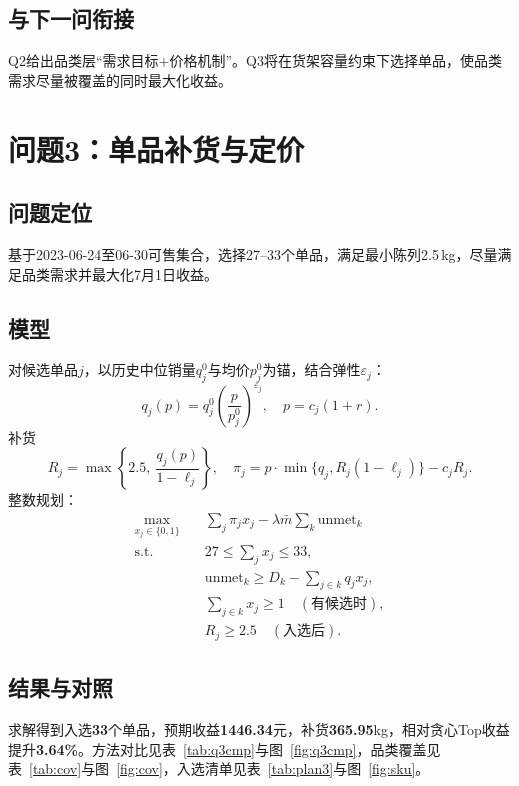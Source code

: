 \documentclass[UTF8,a4paper,12pt]{ctexart}
\begin{document}
\subsection{与下一问衔接}
Q2给出品类层``需求目标+价格机制''。Q3将在货架容量约束下选择单品，使品类需求尽量被覆盖的同时最大化收益。

\section{问题3：单品补货与定价}
\subsection{问题定位}
基于2023-06-24至06-30可售集合，选择27--33个单品，满足最小陈列2.5\,kg，尽量满足品类需求并最大化7月1日收益。

\subsection{模型}
对候选单品$j$，以历史中位销量$q_j^0$与均价$p_j^0$为锚，结合弹性$\varepsilon_j$：
\begin{equation}
q_j(p)=q_j^0\left(\frac{p}{p_j^0}\right)^{\varepsilon_j},\quad
p=c_j(1+r).
\end{equation}
补货
\begin{equation}
R_j=\max\left\{2.5,\ \frac{q_j(p)}{1-\ell_j}\right\},
\quad
\pi_j=p\cdot\min\{q_j,R_j(1-\ell_j)\}-c_j R_j.
\end{equation}
整数规划\cite{mip}：
\begin{align}
\max_{x_j\in\{0,1\}}\quad &
\sum_j \pi_j x_j-\lambda \bar m\sum_{k}\mathrm{unmet}_k \\
\mathrm{s.t.}\quad &
27\le \sum_j x_j\le 33,\\
& \mathrm{unmet}_k \ge D_k-\sum_{j\in k} q_j x_j,\\
& \sum_{j\in k}x_j\ge 1\quad(\text{有候选时}),\\
& R_j\ge 2.5\quad(\text{入选后}).
\end{align}

\subsection{结果与对照}
求解得到入选\textbf{33}个单品，预期收益\textbf{1446.34}元，补货\textbf{365.95}kg，相对贪心Top收益提升\textbf{3.64\%}。方法对比见表~\ref{tab:q3cmp}与图~\ref{fig:q3cmp}，品类覆盖见表~\ref{tab:cov}与图~\ref{fig:cov}，入选清单见表~\ref{tab:plan3}与图~\ref{fig:sku}。
\end{document}
